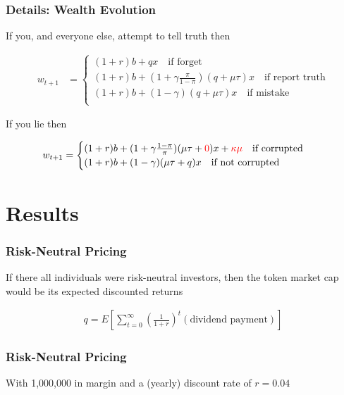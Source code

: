 \documentclass[10pt]{beamer}
\begin{document}
\begin{frame} \frametitle{Details: Wealth Evolution}

  If you, and everyone else, attempt to tell truth then

  \begin{align*}
    w_{t+1} &= \begin{cases} (1 + r) b + q x \quad \text{if forget} \\
                             (1 + r) b + (1 + \gamma \frac{\pi}{1 - \pi}) (q + \mu \tau) x \quad \text{if report truth} \\
                             (1 + r) b + (1 - \gamma) (q + \mu \tau) x \quad \text{if mistake} \\
               \end{cases}
  \end{align*}

  If you lie then

  \begin{align*}
    w_{t+1} &= \begin{cases} (1 + r)b + (1 + \gamma \frac{1 - \pi}{\pi})(\mu \tau + {\color{red} 0}) x + {\color{red}\kappa \mu} \quad \text{if corrupted} \\
                             (1 + r)b + (1 - \gamma)(\mu \tau + q) x \quad \text{if not corrupted}
               \end{cases}
  \end{align*}

\end{frame}

\section{Results}

\begin{frame} \frametitle{Risk-Neutral Pricing}

  If there all individuals were risk-neutral investors, then the token market
  cap would be its expected discounted returns

  \begin{align*}
    q = E \left[ \sum_{t=0}^{\infty} \left(\frac{1}{1 + r} \right)^t (\text{dividend payment}) \right]
  \end{align*}

\end{frame}

\begin{frame} \frametitle{Risk-Neutral Pricing}

  With 1,000,000 in margin and a (yearly) discount rate of $r = 0.04$

  \begin{center}
    \resizebox{0.8\textwidth}{!}{}
  \end{center}
\end{frame}
\end{document}
